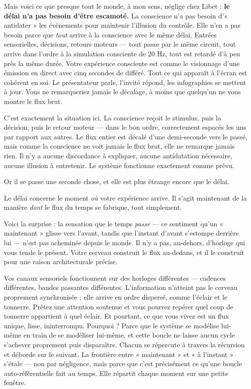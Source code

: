 \documentclass[11pt, twoside, openright]{book}
\begin{document}
Mais voici ce que presque tout le monde, à mon sens, néglige chez Libet : \textbf{le délai n'a pas besoin d'être escamoté.} La conscience n'a pas besoin d'« antidater » les événements pour maintenir l'illusion du contrôle. Elle n'en a pas besoin parce que \textit{tout} arrive à la conscience avec le même délai. Entrées sensorielles, décisions, retours moteurs --- tout passe par le même circuit, tout arrive dans l'ordre à la simulation consciente de 20 Hz, tout est retardé d'à peu près la même durée. Votre expérience consciente est comme le visionnage d'une émission en direct avec cinq secondes de différé. Tout ce qui apparaît à l'écran est cohérent en soi. Le présentateur parle, l'invité répond, les infographies se mettent à jour. Vous ne remarqueriez jamais le décalage, à moins que quelqu'un ne vous montre le flux brut.

C'est exactement la situation ici. La conscience reçoit le stimulus, puis la décision, puis le retour moteur --- dans le bon ordre, correctement espacés les uns par rapport aux autres. Le flux entier est décalé d'une demi-seconde vers le passé, mais comme la conscience ne voit jamais le flux brut, elle ne remarque jamais rien. Il n'y a aucune discordance à expliquer, aucune antidatation nécessaire, aucune illusion à entretenir. Le système fonctionne exactement comme prévu.

Or il se passe une seconde chose, et elle est plus étrange encore que le délai.

Le délai concerne le moment \textit{où} votre expérience arrive. Il s'agit maintenant de la manière \textit{dont} le flux du temps se fabrique, tout simplement.

Voici la surprise : la sensation que le temps \textit{passe} --- ce sentiment qu'un « maintenant » glisse vers l'avant, tandis que l'instant d'avant s'estompe derrière lui --- n'est pas acheminée depuis le monde. Il n'y a pas, au-dehors, d'horloge qui vous tende le présent. Votre cerveau construit le flux au-dedans, et il le construit pour une raison architecturale précise.

Vos canaux sensoriels fonctionnent sur des horloges différentes --- cadences différentes, bandes passantes différentes. L'information n'atteint pas le cerveau proprement synchronisée ; elle arrive en ordre dispersé, comme l'éclair et le tonnerre. Prêtez une attention soutenue et vous pourrez repérer quel coup de tonnerre appartient à quel éclair. Et pourtant, ce que vous vivez est un flux unique, lisse, ininterrompu. Pourquoi ? Parce que le système se modélise lui-même en train de se modéliser lui-même, et cette boucle ne laisse aucun cycle s'achever proprement puis disparaître. Chacun se répercute à travers la récursion et déborde sur le suivant. La frontière entre « maintenant » et « à l'instant » s'étale --- non par négligence, mais parce que c'est précisément ce qu'une boucle auto-référentielle fait au temps. Elle répartit chaque moment sur une petite fenêtre.
\end{document}
